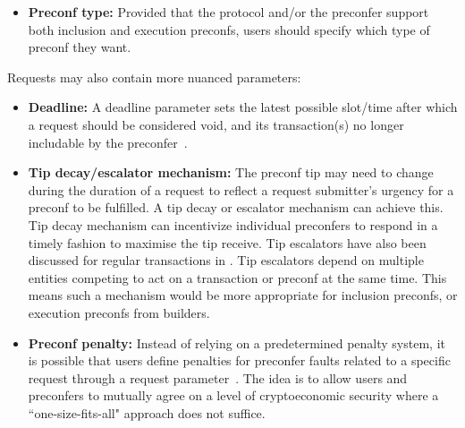 \documentclass[a4paper]{article}
\theoremstyle{boldstyle}
\newcommand{\cm}[1]{\textcolor{blue}{\textbf{Conor:} #1}}
\newcommand{\qb}[1]{\textcolor{red}{\textbf{Quentin:} #1}}
\begin{document}
\begin{itemize}
        \item \textbf{Preconf type:} 
        Provided that the protocol and/or the preconfer support both inclusion and execution preconfs, users should specify which type of preconf they want.
    \end{itemize}

    Requests may also contain more nuanced parameters:
    \begin{itemize}
        \item \textbf{Deadline:} A deadline parameter sets the latest possible slot/time after which a request should be considered void, and its transaction(s) no longer includable by the preconfer~\cite{W:PreconfirmationsforVanillaBasedRollups}. 
        
        \item \textbf{Tip decay/escalator mechanism:} 
        The preconf tip may need to change during the duration of a request to reflect a request submitter's urgency for a preconf to be fulfilled. A tip decay or escalator mechanism can achieve this. Tip decay mechanism can incentivize individual preconfers to respond in a timely fashion to maximise the tip receive\cite{W:Documentation-BidDecayMechanism}. Tip escalators have also been discussed for regular transactions in \cite{W:OrderflowauctionsandcentralisationII:orderflowauctions}. Tip escalators depend on multiple entities competing to act on a transaction or preconf at the same time. This means such a mechanism would be more appropriate for inclusion preconfs, or execution preconfs from builders.   
        
        \item \textbf{Preconf penalty:} Instead of relying on a predetermined penalty system, it is possible that users define penalties for preconfer faults related to a specific request through a request parameter~\cite{W:User-DefinedPenalties:EnsuringHonestPreconfBehavior, W:Documentation-BidStructure}. The idea is to allow users and preconfers to mutually agree on a level of cryptoeconomic security where a ``one-size-fits-all" approach does not suffice.
        

\end{itemize}
\end{document}

